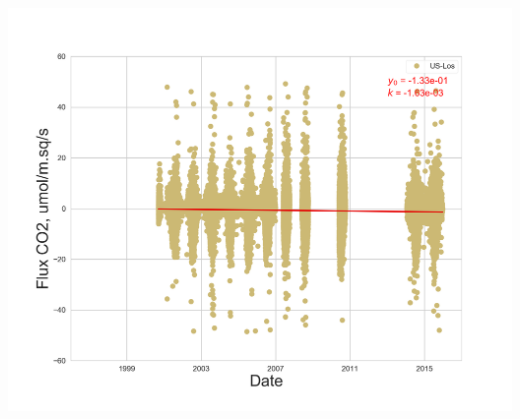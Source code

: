 \documentclass{beamer}
\begin{document}
\begin{frame}
\begin{columns}[t]
\includegraphics[width=\textwidth]{FvsTime/US-Los.png}
\end{columns}

\end{frame}




\end{document}
